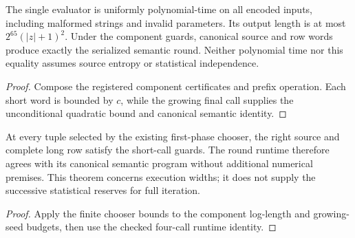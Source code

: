 \begin{theorem}
  \label{thm:lowerbounds-algebraic-affine-round-program}
  \leanok
  The single evaluator is uniformly polynomial-time on all encoded
  inputs, including malformed strings and invalid parameters. Its output
  length is at most $2^{65}(|z|+1)^2$. Under the component guards, canonical
  source and row words produce exactly the serialized semantic round.
  Neither polynomial time nor this equality assumes source entropy or
  statistical independence.
\end{theorem}
\begin{proof}
  \leanok
  Compose the registered component certificates and prefix operation.
  Each short word is bounded by $c$, while the growing final call supplies
  the unconditional quadratic bound and canonical semantic identity.
\end{proof}

\begin{theorem}
  \label{thm:lowerbounds-algebraic-affine-round-parameters}
  \leanok
  At every tuple selected by the existing first-phase chooser, the right
  source and complete long row satisfy the short-call guards. The round
  runtime therefore agrees with its canonical semantic program without
  additional numerical premises. This theorem concerns execution widths;
  it does not supply the successive statistical reserves for full iteration.
\end{theorem}
\begin{proof}
  \leanok
  Apply the finite chooser bounds to the component log-length and
  growing-seed budgets, then use the checked four-call runtime identity.
\end{proof}

